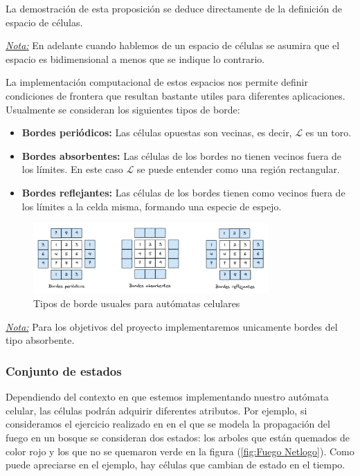 La demostración de esta proposición se deduce directamente de la definición de espacio de células.

\underline{\textit{Nota:}} En adelante cuando hablemos de un espacio de células se asumira que el espacio es bidimensional a menos que se indique lo contrario.

La implementación computacional de estos espacios nos permite definir condiciones de frontera que resultan bastante utiles para diferentes aplicaciones. Usualmente se consideran los siguientes tipos de borde:

\begin{itemize}
    \item \textbf{Bordes periódicos:} Las células opuestas son vecinas, es decir, $\mathcal{L}$ es un toro.
    \item \textbf{Bordes absorbentes:} Las células de los bordes no tienen vecinos fuera de los límites. En este caso $\mathcal{L}$ se puede entender como una región rectangular.
    \item \textbf{Bordes reflejantes:} Las células de los bordes tienen como vecinos fuera de los límites a la celda misma, formando una especie de espejo.
\end{itemize}

\begin{figure}[h]
  \centering
    \includegraphics[width=0.8\textwidth]{Imagenes/Tipos_de_borde.PNG}
  \caption{Tipos de borde usuales para autómatas celulares}
  \label{fig:Tipos de borde}
\end{figure}
    
\underline{\textit{Nota:}} Para los objetivos del proyecto implementaremos unicamente bordes del tipo absorbente.

\subsubsection{Conjunto de estados}

Dependiendo del contexto en que estemos implementando nuestro autómata celular, las células podrán adquirir diferentes atributos. Por ejemplo, si consideramos el ejercicio realizado en  \cite{NetLogoFireModel} en el que se modela la propagación del fuego en un bosque se consideran dos estados: los arboles que están quemados de color rojo y los que no se quemaron verde en la figura (\ref{fig:Fuego Netlogo}). Como puede apreciarse en el ejemplo, hay células que cambian de estado en el tiempo.

